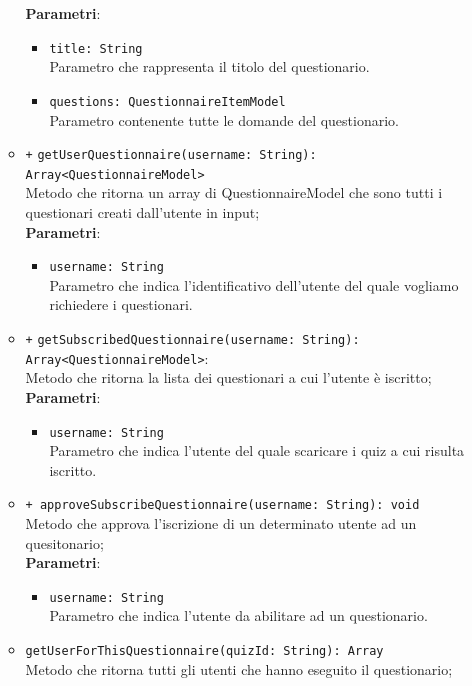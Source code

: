 \begin{itemize}
\begin{itemize}
	\textbf{Parametri}:
	\begin{itemize}
		\item \texttt{title: String} \\ Parametro che rappresenta il titolo del questionario.
		\item \texttt{questions: QuestionnaireItemModel} \\ Parametro contenente tutte le domande del questionario.
	\end{itemize}
	\item \texttt{+} \texttt{getUserQuestionnaire(username: String): Array<QuestionnaireModel>} \\Metodo che ritorna un array di QuestionnaireModel che sono tutti i questionari creati dall'utente in input;\\
	\textbf{Parametri}:
	\begin{itemize}
		\item \texttt{username: String} \\ Parametro che indica l'identificativo dell'utente del quale vogliamo richiedere i questionari.
	\end{itemize}
	\item \texttt{+} \texttt{getSubscribedQuestionnaire(username: String): Array<QuestionnaireModel>}: \\Metodo che ritorna la lista dei questionari a cui l'utente è iscritto;\\
	\textbf{Parametri}:
	\begin{itemize}
		\item \texttt{username: String} \\ Parametro che indica l'utente del quale scaricare i quiz a cui risulta iscritto.
	\end{itemize}
	\item \texttt{+ approveSubscribeQuestionnaire(username: String): void} \\ Metodo che approva l'iscrizione di un determinato utente ad un quesitonario; \\
	\textbf{Parametri}:
	\begin{itemize}
		\item \texttt{username: String} \\ Parametro che indica l'utente da abilitare ad un questionario.
	\end{itemize}
	\item \texttt{getUserForThisQuestionnaire(quizId: String): Array} \\ Metodo che ritorna tutti gli utenti che hanno eseguito il questionario; \\

\end{itemize}
\end{itemize}
